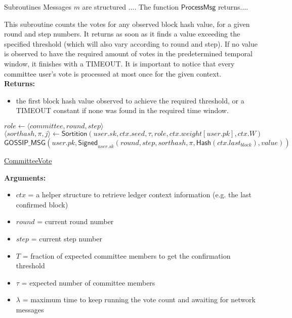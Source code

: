 \documentclass[10pt,a4paper]{article}
\begin{document}
\begin{section}{Subroutines}
Messages $m$ are structured ....
The function $\mathsf{ProcessMsg}$ returns....

This subroutine counts the votes for any observed block hash value, for a given 
round and step numbers.
It returns as soon as it finds a value exceeding the specified threshold (which
will also vary according to round and step).
If no value is observed to have the required amount of votes in the predetermined 
temporal window, it finishes with a TIMEOUT.
It is important to notice that every committee user's vote is processed at most 
once for the given context.\\

\noindent \textbf{Returns:}
\begin{itemize}
    \item the first block hash value observed to achieve the required threshold, 
    or a TIMEOUT constant if none was found in the required time window.
  \end{itemize}


\begin{algorithm}[H]
    \begin{algorithmic}[H]
        \State $role \gets \langle {committee},round,step\rangle$
        \State $\langle sorthash,\pi,j\rangle \gets \mathsf{Sortition}(user.sk,ctx.seed,\tau ,role,ctx.weight[user.pk],ctx.W)$
            \State $\mathsf{GOSSIP\_MSG}(user.pk, \mathsf{Signed}_{user.sk} (round,step,sorthash,\pi,\mathsf{Hash}(ctx.last_{block}),value))$
        \EndIf
    \EndFunction
    \end{algorithmic}
    \caption{\underline{CommitteeVote}}
\end{algorithm}

\noindent \textbf{Arguments:}
\begin{itemize}
    \item $ctx$ = a helper structure to retrieve ledger context information (e.g. the last confirmed block)
    \item $round$ = current round number
    \item $step$ = current step number
    \item $T$ = fraction of expected committee members to get the confirmation threshold
    \item $\tau$ = expected number of committee members
    \item $\lambda$ = maximum time to keep running the vote count and awaiting for network messages
  \end{itemize}


\end{section}
\end{document}
